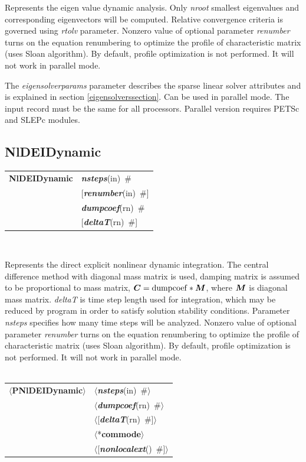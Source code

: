 \documentclass[a4paper]{article}
\makeatletter
\newcommand{\mbf}[1]{\mbox{\boldmath$#1$}}
\newcommand{\param}[1]{{\em #1}}
\newcommand{\keywordnotype}[1]{\mbox{{\it{\bf{#1}}}}}
\newcommand{\keyword}[2]{\mbox{{\keywordnotype{#1}\tiny (#2)}}}
\newcommand{\entKeywordInst}[1]{\mbox{{\bf{{#1}}}}}
\newcommand{\field}[2]{\mbox{\keyword{#1}{#2}~\#}}
\newcommand{\optField}[2]{\mbox{[\field{#1}{#2}]}}
\newcommand{\Pmode}[1]{{\sffamily #1}}
\newcommand{\PentKeyword}[1]{\mbox{{$\langle$*{\bf{#1}}$\rangle$}}}
\newcommand{\PentKeywordInst}[1]{\mbox{$\langle${\bf{{#1}}}$\rangle$}}
\newcommand{\Pfield}[2]{\mbox{$\langle$\keyword{#1}{#2}~\#$\rangle$}}
\newcommand{\PoptField}[2]{\mbox{$\langle$[\field{#1}{#2}]$\rangle$}}
\newenvironment{record}[1][]{\begin{tabular}{|ll}}{\end{tabular}\\}
\newcommand{\recentry}[2]{{#1}&{#2}\\}
\newcounter{rcc}
\newenvironment{record}[1][\textwidth]{\setcounter{rcc}{0}\begin{tabular*}{#1}{|ll@{\extracolsep{\fill}}r}}{\end{tabular*}\\}
\newcommand{\recentry}[2]{\ifthenelse{\value{rcc}>0}{&$\backslash$ \\}{\setcounter{rcc}{1}}{#1}&{#2}}
\makeatother
\begin{document}
Represents the eigen value dynamic analysis.
Only \param{nroot} smallest eigenvalues and corresponding
eigenvectors will be computed. Relative convergence criteria is
governed using \param{rtolv} parameter.
Nonzero value of optional parameter \param{renumber} turns on the
equation renumbering to optimize the profile of characteristic matrix
(uses Sloan algorithm). By default, profile optimization is not
performed. It will not work in parallel mode.

The \param{eigensolverparams} parameter describes the sparse
linear solver attributes and is explained in section \ref{eigensolverssection}.
\Pmode{Can be used in parallel mode. The input record must be the same
for all processors. Parallel version requires PETSc and SLEPc modules.}


\subsection{NlDEIDynamic}
\label{NlDEIDynamic}
\begin{record}
\recentry{\entKeywordInst{NlDEIDynamic}}{\field{nsteps}{in}}
\recentry{}{\optField{renumber}{in}}
\recentry{}{\field{dumpcoef}{rn}} \recentry{}{\optField{deltaT}{rn}}
\end{record}

Represents the direct explicit  nonlinear dynamic  integration.
The central difference method with diagonal mass matrix is used,
damping matrix is assumed to be proportional to mass matrix, $\mbf{C}
= {\rm dumpcoef} * \mbf{M}$, where
$\mbf{M}$ is diagonal mass matrix. \param{deltaT} is time step length used for
integration, which may be reduced by program in order to satisfy
solution stability conditions. Parameter \param{nsteps} specifies
how many time steps will be analyzed.
Nonzero value of optional parameter \param{renumber} turns on the
equation renumbering to optimize the profile of characteristic matrix
(uses Sloan algorithm). By default, profile optimization is not
performed. It will not work in parallel mode.
\\ \\
\noindent
\begin{record}
\recentry{\PentKeywordInst{PNlDEIDynamic}}{\Pfield{nsteps}{in}}
\recentry{}{\Pfield{dumpcoef}{rn}} \recentry{}{\PoptField{deltaT}{rn}}
\recentry{}{\PentKeyword{commode}} \recentry{}{\PoptField{nonlocalext}{}}
\end{record}
\end{document}
